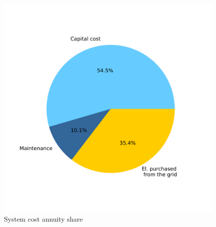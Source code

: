 \documentclass[english]{SPFShortReport}
\begin{document}
\begin{figure}[!htbp]
\begin{center}
\includegraphics[width=1\textwidth]{costShareAnnuity-HydD_mfb30_ideal_dryN-CityBAS_dryNAc1.0x35.659Vice0.2x35.659HP1.0x17.109-Year0.pdf}
\caption{System cost annuity share}
\label{systemCostannuity}
\end{center}
\end{figure}
\end{document}
